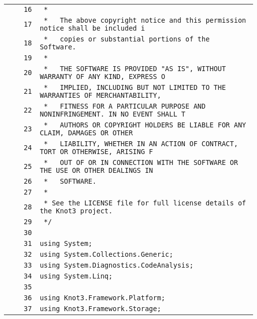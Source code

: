 \documentclass[a4paper,10pt]{article}
\begin{document}
\begin{longtable}[l]{lrrl}
\cellcolor{gray} &  & \verb~16~ & \verb~ *~\\
\cellcolor{gray} &  & \verb~17~ & \verb~ *   The above copyright notice and this permission notice shall be included i~\\
\cellcolor{gray} &  & \verb~18~ & \verb~ *   copies or substantial portions of the Software.~\\
\cellcolor{gray} &  & \verb~19~ & \verb~ *~\\
\cellcolor{gray} &  & \verb~20~ & \verb~ *   THE SOFTWARE IS PROVIDED "AS IS", WITHOUT WARRANTY OF ANY KIND, EXPRESS O~\\
\cellcolor{gray} &  & \verb~21~ & \verb~ *   IMPLIED, INCLUDING BUT NOT LIMITED TO THE WARRANTIES OF MERCHANTABILITY,~\\
\cellcolor{gray} &  & \verb~22~ & \verb~ *   FITNESS FOR A PARTICULAR PURPOSE AND NONINFRINGEMENT. IN NO EVENT SHALL T~\\
\cellcolor{gray} &  & \verb~23~ & \verb~ *   AUTHORS OR COPYRIGHT HOLDERS BE LIABLE FOR ANY CLAIM, DAMAGES OR OTHER~\\
\cellcolor{gray} &  & \verb~24~ & \verb~ *   LIABILITY, WHETHER IN AN ACTION OF CONTRACT, TORT OR OTHERWISE, ARISING F~\\
\cellcolor{gray} &  & \verb~25~ & \verb~ *   OUT OF OR IN CONNECTION WITH THE SOFTWARE OR THE USE OR OTHER DEALINGS IN~\\
\cellcolor{gray} &  & \verb~26~ & \verb~ *   SOFTWARE.~\\
\cellcolor{gray} &  & \verb~27~ & \verb~ *~\\
\cellcolor{gray} &  & \verb~28~ & \verb~ * See the LICENSE file for full license details of the Knot3 project.~\\
\cellcolor{gray} &  & \verb~29~ & \verb~ */~\\
\cellcolor{gray} &  & \verb~30~ & \verb~~\\
\cellcolor{gray} &  & \verb~31~ & \verb~using System;~\\
\cellcolor{gray} &  & \verb~32~ & \verb~using System.Collections.Generic;~\\
\cellcolor{gray} &  & \verb~33~ & \verb~using System.Diagnostics.CodeAnalysis;~\\
\cellcolor{gray} &  & \verb~34~ & \verb~using System.Linq;~\\
\cellcolor{gray} &  & \verb~35~ & \verb~~\\
\cellcolor{gray} &  & \verb~36~ & \verb~using Knot3.Framework.Platform;~\\
\cellcolor{gray} &  & \verb~37~ & \verb~using Knot3.Framework.Storage;~\\

\end{longtable}
\end{document}
